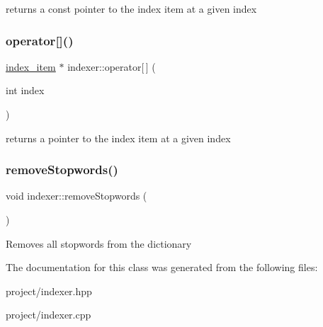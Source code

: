 returns a const pointer to the index item at a given index \mbox{\label{classindexer_abcf129b0575f95fa455b69dfb51edc44}} 
\subsubsection{\texorpdfstring{operator[]()}{operator[]()}\hspace{0.1cm}{\footnotesize\ttfamily [2/2]}}
{\footnotesize\ttfamily \hyperlink{classindex__item}{index\+\_\+item} $\ast$ indexer\+::operator\mbox{[}$\,$\mbox{]} (\begin{DoxyParamCaption}\item[{int}]{index }\end{DoxyParamCaption})}

returns a pointer to the index item at a given index \mbox{\label{classindexer_a8c173bf8a59861ffec816f5b79737a6e}} 
\subsubsection{\texorpdfstring{remove\+Stopwords()}{removeStopwords()}}
{\footnotesize\ttfamily void indexer\+::remove\+Stopwords (\begin{DoxyParamCaption}{ }\end{DoxyParamCaption})}

Removes all stopwords from the dictionary 

The documentation for this class was generated from the following files\+:\begin{DoxyCompactItemize}
\item 
project/indexer.\+hpp\item 
project/indexer.\+cpp\end{DoxyCompactItemize}
